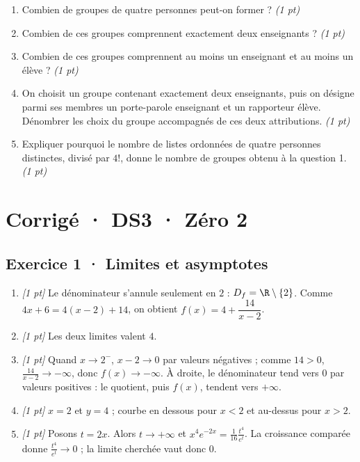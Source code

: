 \begin{enumerate}

\item Combien de groupes de quatre personnes peut-on former ? \hfill\textit{(1 pt)}

\item Combien de ces groupes comprennent exactement deux enseignants ? \hfill\textit{(1 pt)}

\item Combien de ces groupes comprennent au moins un enseignant et au moins un élève ? \hfill\textit{(1 pt)}

\item On choisit un groupe contenant exactement deux enseignants, puis on désigne parmi ses membres un porte-parole enseignant et un rapporteur élève. Dénombrer les choix du groupe accompagnés de ces deux attributions. \hfill\textit{(1 pt)}

\item Expliquer pourquoi le nombre de listes ordonnées de quatre personnes distinctes, divisé par $4!$, donne le nombre de groupes obtenu à la question 1. \hfill\textit{(1 pt)}

\end{enumerate}

\ifprof\clearpage

\section*{Corrigé · DS3 · Zéro 2}\label{cor:4-2}

\subsection*{Exercice 1 · Limites et asymptotes}\begin{enumerate}

\item \textit{[1 pt]} Le dénominateur s'annule seulement en $2$ : $D_f=\R\setminus\{2\}$. Comme $4x+6=4(x-2)+14$, on obtient $f(x)=4+\dfrac{14}{x-2}$.

\item \textit{[1 pt]} Les deux limites valent $4$.

\item \textit{[1 pt]} Quand $x\to 2^-$, $x-2\to0$ par valeurs négatives ; comme $14>0$, $\frac{14}{x-2}\to-\infty$, donc $f(x)\to-\infty$. À droite, le dénominateur tend vers $0$ par valeurs positives : le quotient, puis $f(x)$, tendent vers $+\infty$.

\item \textit{[1 pt]} $x=2$ et $y=4$ ; courbe en dessous pour $x<2$ et au-dessus pour $x>2$.

\item \textit{[1 pt]} Posons $t=2x$. Alors $t\to+\infty$ et $x^4e^{-2x}=\frac{1}{16}\frac{t^4}{e^t}$. La croissance comparée donne $\frac{t^4}{e^t}\to0$ ; la limite cherchée vaut donc $0$.

\end{enumerate}

